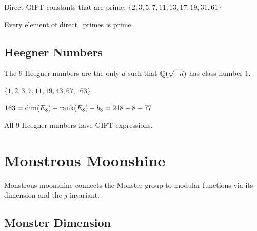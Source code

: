 \begin{definition}\label{def:direct_primes}
    \leanok
    Direct GIFT constants that are prime: $\{2, 3, 5, 7, 11, 13, 17, 19, 31, 61\}$
\end{definition}

\begin{theorem}\label{thm:direct_all_prime}
    \leanok
    Every element of direct\_primes is prime.
\end{theorem}

\section{Heegner Numbers}

The 9 Heegner numbers are the only $d$ such that $\mathbb{Q}(\sqrt{-d})$ has class number 1.

\begin{definition}\label{def:heegner}
    \leanok
    $\{1, 2, 3, 7, 11, 19, 43, 67, 163\}$
\end{definition}

\begin{theorem}[Heegner 163]\label{thm:heegner_163}
    \leanok
    $163 = \mathrm{dim}(E_8) - \mathrm{rank}(E_8) - b_3 = 248 - 8 - 77$
\end{theorem}

\begin{theorem}\label{thm:heegner_all}
    \leanok
    All 9 Heegner numbers have GIFT expressions.
\end{theorem}

\chapter{Monstrous Moonshine}\label{chap:moonshine}

Monstrous moonshine connects the Monster group to modular functions via its dimension and the $j$-invariant.

\section{Monster Dimension}

